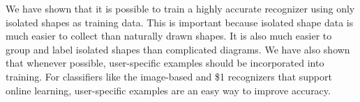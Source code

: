 \documentclass[final,5p,twocolumn]{elsarticle}
\begin{document}
We have shown that it is possible to train a highly accurate
recognizer using only isolated shapes as training data. This is
important because isolated shape data is much easier to collect than
naturally drawn shapes. It is also much easier to group and label
isolated shapes than complicated diagrams.  We have also shown that
whenever possible, user-specific examples should be incorporated into
training. For classifiers like the image-based and \$1 recognizers
that support online learning, user-specific examples are an easy way
to improve accuracy.





\end{document}
